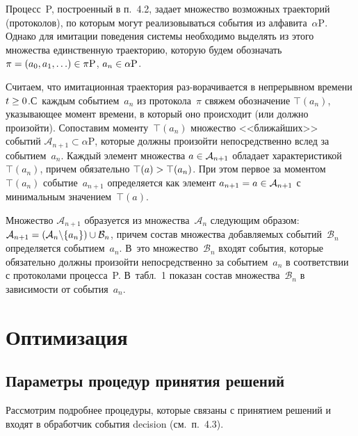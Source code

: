 \begin{multicols}{2}
    Процесс~P, построенный в п.~4.2, задает множество возможных 
траекторий (протоколов), по которым могут реализовываться события из 
алфавита~$\alpha\mathrm{P}$. Однако для имитации поведения системы 
необходимо выделять из этого множества единственную траекторию, 
которую будем обозначать $\pi\hm=(a_0,a_1, \ldots) \hm\in \pi\mathrm{P}$, 
$a_n\hm\in \alpha\mathrm{P}$.
    
    Считаем, что имитационная траектория раз-\linebreak ворачивается в непрерывном 
времени $t\hm\geq 0$.\linebreak С~каж\-дым событием~$a_n$ из протокола~$\pi$ 
свяжем обозначение $\top (a_n)$, указывающее момент времени, в который 
оно происходит (или должно про\-изойти). Сопоставим моменту~$\top(a_n)$ 
множество <<ближайших>> событий $\mathcal{A}_{n+1}\subset \alpha\mathrm{P}$, 
которые должны произойти непосредственно вслед за событием~$a_n$. 
Каждый элемент множества $a\hm\in \mathcal{A}_{n+1}$ обладает характеристикой 
$\top(a_n)$, причем обязательно $\top(a)\hm>\top(a_n)$. При этом первое за 
моментом~$\top(a_n)$ событие~$a_{n+1}$ определяется как элемент 
$a_{n+1}\hm=a\hm\in \mathcal{A}_{n+1}$ с минимальным значением~$\top(a)$.
    
    Множество $\mathcal{A}_{n+1}$ образуется из множества~$\mathcal{A}_n$ следующим 
образом: $\mathcal{A}_{n+1}\hm=\left( \mathcal{A}_n\backslash \{a_n\}\right)\cup \mathcal{B}_n$, причем 
состав множества добавляемых событий~$\mathcal{B}_n$ определяется 
событием~$a_n$. В~это множество~$\mathcal{B}_n$ входят события, которые 
обязательно должны произойти непосредственно за событием~$a_n$ в 
соответствии с протоколами процесса~P. В~табл.~1 показан состав 
множества~$\mathcal{B}_n$ в зависимости от события~$a_n$.
    

\section{Оптимизация}

\subsection{Параметры процедур принятия решений}

    Рассмотрим подробнее процедуры, которые связаны с принятием 
решений и входят в обработчик события decision (см.\ п.~4.3).
    
    \smallskip
    

\end{multicols}
